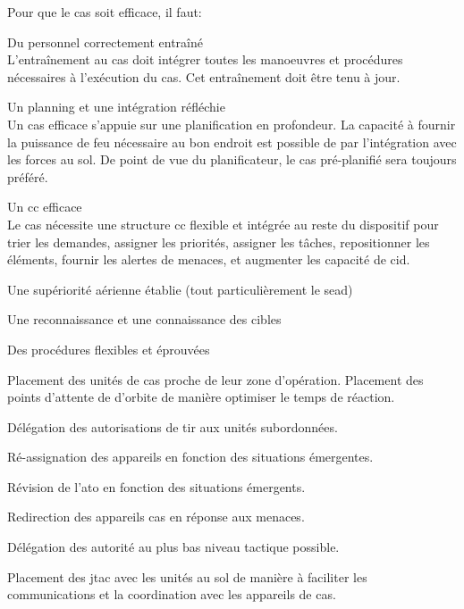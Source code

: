 \begin{e1}
	\item 
	Pour que le \gls{cas} soit efficace, il faut:
	\begin{e2}
		\item Du personnel correctement entraîné \\
		L'entraînement au \gls{cas} doit intégrer toutes les manoeuvres et procédures nécessaires à l'exécution du \gls{cas}. Cet entraînement doit être tenu à jour.
		\item Un planning et une intégration réfléchie \\
		Un \gls{cas} efficace s'appuie sur une planification en profondeur. La capacité à fournir la puissance de feu nécessaire au bon endroit est possible de par l'intégration avec les forces au sol. De point de vue du planificateur, le \gls{cas} pré-planifié sera toujours préféré.
		\item Un \gls{cc} efficace \\
		Le \gls{cas} nécessite une structure \gls{cc} flexible et intégrée au reste du dispositif pour trier les demandes, assigner les priorités, assigner les tâches, repositionner les éléments, fournir les alertes de menaces, et augmenter les capacité de \gls{cid}.
		\item Une supériorité aérienne établie (tout particulièrement le \gls{sead})
		\item Une reconnaissance et une connaissance des cibles
		\item Des procédures flexibles et éprouvées
		\begin{e3}
			\item Placement des unités de \gls{cas} proche de leur zone d'opération. Placement des points d'attente de d'orbite de manière optimiser le temps de réaction.
			\item Délégation des autorisations de tir aux unités subordonnées.
			\item Ré-assignation des appareils en fonction des situations émergentes.
			\item Révision de l'\gls{ato} en fonction des situations émergents.
			\item Redirection des appareils \gls{cas} en réponse aux menaces.
			\item Délégation des autorité au plus bas niveau tactique possible.
			\item Placement des \gls{jtac} avec les unités au sol de manière à faciliter les communications et la coordination avec les appareils de \gls{cas}.			
		\end{e3}

\end{e2}
\end{e1}
